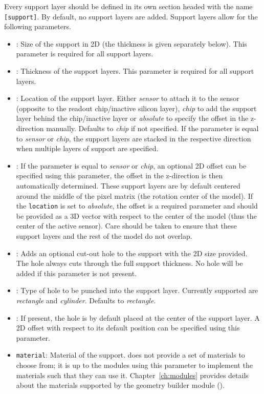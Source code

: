 Every support layer should be defined in its own section headed with the name \texttt{[support]}.
By default, no support layers are added.
Support layers allow for the following parameters.
\begin{itemize}
\item {}: Size of the support in 2D (the thickness is given separately below).
This parameter is required for all support layers.
\item {}: Thickness of the support layers.
This parameter is required for all support layers.
\item {}: Location of the support layer.
Either \textit{sensor} to attach it to the sensor (opposite to the readout chip/inactive silicon layer), \textit{chip} to add the support layer behind the chip/inactive layer or \textit{absolute} to specify the offset in the z-direction manually.
Defaults to \textit{chip} if not specified.
If the parameter is equal to \textit{sensor} or \textit{chip}, the support layers are stacked in the respective direction when multiple layers of support are specified.
\item {}: If the parameter  is equal to \textit{sensor} or \textit{chip}, an optional 2D offset can be specified using this parameter, the offset in the z-direction is then automatically determined.
These support layers are by default centered around the middle of the pixel matrix (the rotation center of the model).
If the \texttt{location} is set to \textit{absolute}, the offset is a required parameter and should be provided as a 3D vector with respect to the center of the model (thus the center of the active sensor).
Care should be taken to ensure that these support layers and the rest of the model do not overlap.
\item {}: Adds an optional cut-out hole to the support with the 2D size provided.
The hole always cuts through the full support thickness.
No hole will be added if this parameter is not present.
\item {}: Type of hole to be punched into the support layer. Currently supported are \textit{rectangle} and \textit{cylinder}. Defaults to \textit{rectangle}.
\item {}: If present, the hole is by default placed at the center of the support layer.
A 2D offset with respect to its default position can be specified using this parameter.
\item \texttt{material}: Material of the support. \apsq does not provide a set of materials to choose from; it is up to the modules using this parameter to implement the materials such that they can use it.
Chapter~\ref{ch:modules} provides details about the materials supported by the geometry builder module ().
\end{itemize}

